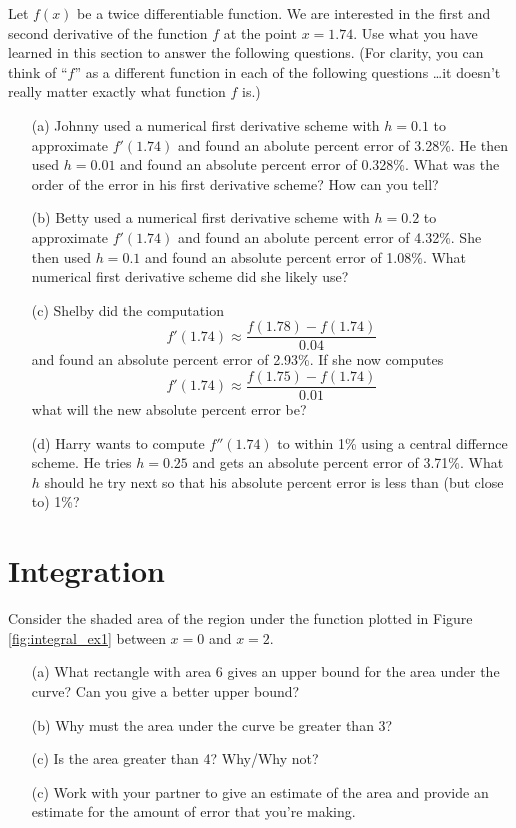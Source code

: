 \begin{problem}
    Let $f(x)$ be a twice differentiable function.  We are interested in the first and
    second derivative of the function $f$ at the point $x = 1.74$.  Use what you have
    learned in this section to answer the following questions. (For clarity, you can think
    of ``$f$'' as a different function in each of the following questions \ldots it
    doesn't really matter exactly what function $f$ is.)
    \begin{enumerate}
        \item[(a)] Johnny used a numerical first derivative scheme with $h = 0.1$ to
            approximate $f'(1.74)$ and found an abolute percent error of 3.28\%.  He then
            used $h=0.01$ and found an absolute percent error of 0.328\%.  What was the
            order of the error in his first derivative scheme? How can you tell?
        \item[(b)] Betty used a numerical first derivative scheme with $h = 0.2$ to
            approximate $f'(1.74)$ and found an abolute percent error of 4.32\%.  She then used
            $h=0.1$ and found an absolute percent error of 1.08\%.  What numerical first
            derivative scheme did she likely use?
        \item[(c)] Shelby did the computation 
            \[ f'(1.74) \approx \frac{f(1.78) - f(1.74)}{0.04} \]
            and found an absolute percent error of 2.93\%.  If she now computes 
            \[ f'(1.74) \approx \frac{f(1.75) - f(1.74)}{0.01} \]
            what will the new absolute percent error be?
        \item[(d)] Harry wants to compute $f''(1.74)$ to within 1\% using a central
            differnce scheme.  He tries $h=0.25$
            and gets an absolute percent error of 3.71\%.  What $h$ should he try next so
            that his absolute percent error is less than (but close to) 1\%?
    \end{enumerate}
\end{problem}




\newpage\section{Integration}
\begin{problem}
    Consider the shaded area of the region under the function plotted in Figure
    \ref{fig:integral_ex1} between $x=0$ and $x=2$.  
    \begin{enumerate}
        \item[(a)] What rectangle with area 6 gives an upper bound for the area under the
            curve? Can you give a better upper bound?
        \item[(b)] Why must the area under the curve be greater than 3?
        \item[(c)] Is the area greater than 4? Why/Why not?
        \item[(c)] Work with your partner to give an estimate of the area and provide an
            estimate for the amount of error that you're making.
    \end{enumerate}
\end{problem}

